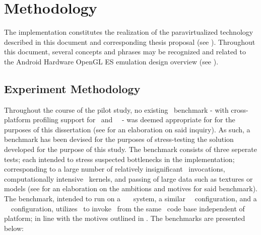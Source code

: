 
\chapter{Methodology}
\label{cha:methodology}
The implementation constitutes the realization of the paravirtualized technology described in this document and corresponding thesis proposal (see ).
Throughout this document, several concepts and phrases may be recognized and related to the Android Hardware OpenGL ES emulation design overview (see ).


\section{Experiment Methodology}
\label{sec:methodology_experimentmethodology}
Throughout the course of the pilot study, no existing \dvttermopenglestwopointo\ benchmark - with cross-platform profiling support for \dvttermandroid\ and \dvttermxeleven\ \dvttermlinux\ - was deemed appropriate for for the purposes of this dissertation (see  for an elaboration on said inquiry).
As such, a benchmark has been devised for the purposes of stress-testing the solution developed for the purpose of this study.
The benchmark consists of three seperate tests; each intended to stress suspected bottlenecks in the implementation; corresponding to a large number of relatively insignificant \dvttermopengl\ invocations, computationally intensive \dvttermgpu\ kernels, and passing of large data such as textures or models (see  for an elaboration on the ambitions and motives for said benchmark).
The benchmark, intended to run on a \dvttermhost\ \dvttermfedora\ \dvttermlinux\ system, a similar \dvttermsimics\ \dvttermfedora\ configuration, and a \dvttermqemu\ \dvttermandroid\ configuration, utilizes \dvttermjni\ to invoke \dvttermopengles\ from the same \dvttermc\ code base independent of platform; in line with the motives outlined in .
The benchmarks are presented below:

